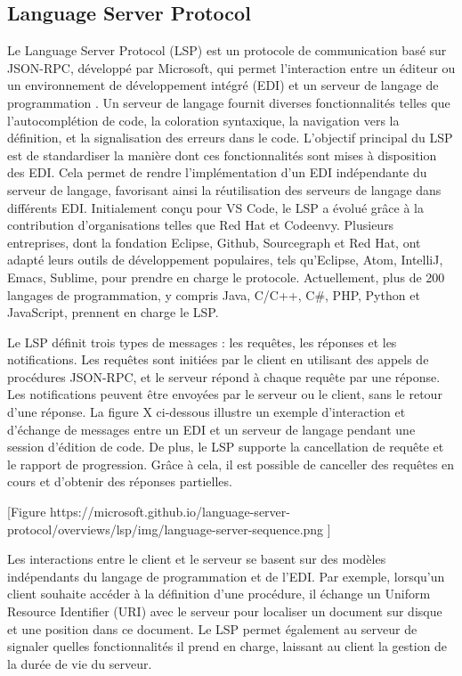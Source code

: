 \subsection{Language Server Protocol}

Le Language Server Protocol (LSP) est un protocole de communication basé sur JSON-RPC, développé par Microsoft, qui permet l'interaction entre un éditeur ou un environnement de développement intégré (EDI) et un serveur de langage de programmation \cite{Keidel2016}. Un serveur de langage fournit diverses fonctionnalités telles que l'autocomplétion de code, la coloration syntaxique, la navigation vers la définition, et la signalisation des erreurs dans le code. L'objectif principal du LSP est de standardiser la manière dont ces fonctionnalités sont mises à disposition des EDI. Cela permet de rendre l'implémentation d'un EDI indépendante du serveur de langage, favorisant ainsi la réutilisation des serveurs de langage dans différents EDI. Initialement conçu pour VS Code, le LSP a évolué grâce à la contribution d'organisations telles que Red Hat et Codeenvy. Plusieurs entreprises, dont la fondation Eclipse, Github, Sourcegraph et Red Hat, ont adapté leurs outils de développement populaires, tels qu'Eclipse, Atom, IntelliJ, Emacs, Sublime, pour prendre en charge le protocole. Actuellement, plus de 200 langages de programmation, y compris Java, C/C++, C\#, PHP, Python et JavaScript, prennent en charge le LSP.

Le LSP définit trois types de messages : les requêtes, les réponses et les notifications. Les requêtes sont initiées par le client en utilisant des appels de procédures JSON-RPC, et le serveur répond à chaque requête par une réponse. Les notifications peuvent être envoyées par le serveur ou le client, sans le retour d'une réponse. La figure X ci-dessous illustre un exemple d'interaction et d'échange de messages entre un EDI et un serveur de langage pendant une session d'édition de code. De plus, le LSP supporte la cancellation de requête et le rapport de progression. Grâce à cela, il est possible de canceller des requêtes en cours et d'obtenir des réponses partielles.

    [Figure https://microsoft.github.io/language-server-protocol/overviews/lsp/img/language-server-sequence.png ]

Les interactions entre le client et le serveur se basent sur des modèles indépendants du langage de programmation et de l'EDI. Par exemple, lorsqu'un client souhaite accéder à la définition d'une procédure, il échange un Uniform Resource Identifier (URI) avec le serveur pour localiser un document sur disque et une position dans ce document. Le LSP permet également au serveur de signaler quelles fonctionnalités il prend en charge, laissant au client la gestion de la durée de vie du serveur.

